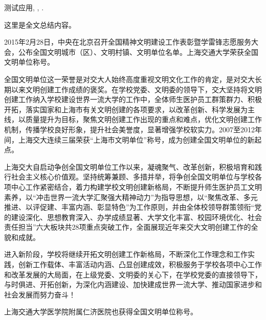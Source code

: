
\begin{summary}

测试应用\cite{JohnD}, \cite{chen2007act}, \cite{chen2007ewi}.


这里是全文总结内容。

2015年2月28日，中央在北京召开全国精神文明建设工作表彰暨学雷锋志愿服务大会，公布全国文明城市（区）、文明村镇、文明单位名单。上海交通大学荣获全国文明单位称号。         

全国文明单位这一荣誉是对交大人始终高度重视文明文化工作的肯定，是对交大长期以来文明创建工作成绩的褒奖。在学校党委、文明委的领导下，交大坚持将文明创建工作纳入学校建设世界一流大学的工作中，全体师生医护员工群策群力、积极开拓，落实国家和上海市有关文明创建的各项要求，以改革创新、科学发展为主线，以质量提升为目标，聚焦文明创建工作出现的重点和难点，优化文明创建工作机制，传播学校良好形象，提升社会美誉度，显著增强学校软实力。2007至2012年间，上海交大连续三届荣获“上海市文明单位”称号，成为创建全国文明单位的新起点。         

上海交大自启动争创全国文明单位工作以来，凝魂聚气、改革创新，积极培育和践行社会主义核心价值观。坚持统筹兼顾、多措并举，将争创全国文明单位与学校各项中心工作紧密结合，着力构建学校文明创建新格局，不断提升师生医护员工文明素养，以“冲击世界一流大学汇聚强大精神动力”为指导思想，以“聚焦改革、多元推进、以评促建、丰富内涵、彰显特色”为工作原则，并由全体校领导群策领衔“党的建设深化、思想教育深入、办学成绩显著、大学文化丰富、校园环境优化、社会责任担当”六大板块共28项重点突破工作，全面展现近年来交大文明创建工作的全貌和成就。         

进入新阶段，学校将继续开拓文明创建工作新格局，不断深化工作理念和工作实践，创新工作载体、丰富活动内涵、凸显创建成效，积极服务于学校各项中心工作和改革发展的大局面，在上级党委、文明委的关心下，在学校党委的直接领导下，与时俱进、开拓创新，为深化内涵建设、加快建成世界一流大学、推动国家进步和社会发展而努力奋斗！       

上海交通大学医学院附属仁济医院也获得全国文明单位称号。      

\end{summary}
